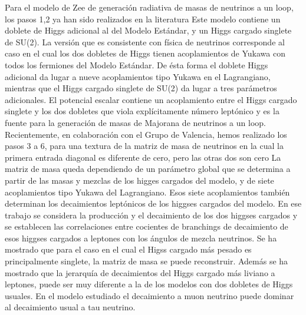 \begin{ideas}
Para el modelo de Zee de generación radiativa de masas de neutrinos a
un loop, los pasos 1,2 ya han sido realizados en la literatura
Este modelo contiene un doblete de Higgs
adicional al del Modelo Estándar, y un Higgs cargado singlete de
SU(2). La versión que es consistente con física de neutrinos
corresponde al caso en el cual los dos dobletes de Higgs tienen
acoplamientos de Yukawa con todos los fermiones del Modelo Estándar.
De ésta forma el doblete Higgs adicional da lugar a nueve
acoplamientos tipo Yukawa en el Lagrangiano, mientras que el Higgs
cargado singlete de SU(2) da lugar a tres parámetros adicionales. El
potencial escalar contiene un acoplamiento entre el Higgs cargado
singlete y los dos dobletes que viola explícitamente número leptónico
y es la fuente para la generación de masas de Majorana de neutrinos a
un loop. Recientemente, en colaboración con el Grupo de Valencia,
hemos realizado los pasos 3 a 6, para una textura de la matriz de masa
de neutrinos en la cual la primera entrada diagonal es diferente de
cero, pero las otras dos son cero %
La
matriz de masa queda dependiendo de un parámetro global que se
determina a partir de las masas y mezclas de los higges cargados del
modelo, y de siete acoplamientos tipo Yukawa del Lagrangiano. Esos
siete acoplamientos también determinan los decaimientos leptónicos de
los higgses cargados del modelo. En ese trabajo se considera la
producción y el decaimiento de los dos higgses cargados y se
establecen las correlaciones entre cocientes de branchings de
decaimiento de esos higgses cargados a leptones con los ángulos de
mezcla neutrinos. Se ha mostrado que para el caso en el cual el Higss
cargado más pesado es principalmente singlete, la matriz de masa se
puede reconstruir. Además se ha mostrado que la jerarquía de
decaimientos del Higgs cargado más liviano a leptones, puede ser muy
diferente a la de los modelos con dos dobletes de Higgs usuales.  En
el modelo estudiado el decaimiento a muon neutrino puede dominar al
decaimiento usual a tau neutrino.



\end{ideas}
